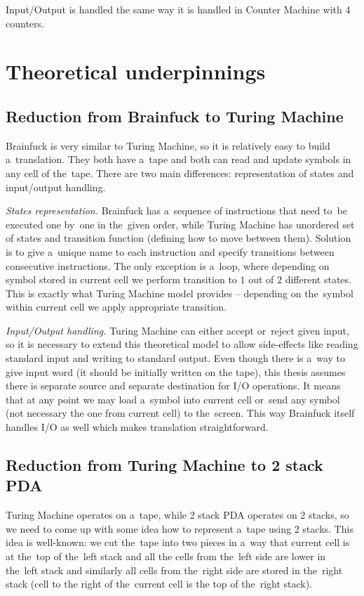 \documentclass[english,shortabstract,mgr]{iithesis}
\begin{document}
Input/Output is handled the same way it is handled in Counter Machine with 4 counters.


\chapter{Theoretical underpinnings}

\section {Reduction from Brainfuck to Turing Machine}

Brainfuck is very similar to Turing Machine, so it is relatively easy to build
a~translation. They both have a~tape and both can read and update symbols in any
cell of the~tape. There are two main differences: representation of states and
input/output handling.

\textit{States representation.}
Brainfuck has a~sequence of instructions that need to~be
executed one by~one in the~given order, while Turing Machine has unordered set
of states and transition function (defining how to move between them). Solution
is to give a~unique name to each instruction and specify transitions between
consecutive instructions. The only exception is a~loop, where depending on
symbol stored in current cell we perform transition to $1$ out of $2$ different states.
This is exactly what Turing Machine model provides -- depending on the~symbol
within current cell we apply appropriate transition.

\textit{Input/Output handling.}
Turing Machine can either accept or~reject given input, so it is necessary to
extend this theoretical model to allow side-effects like reading standard
input and writing to standard output. Even though there is a~way to give
input word (it should be initially written on the tape), this thesis assumes
there is separate source and separate destination for I/O operations.
It means that at any point we may load a~symbol into current cell or~send
any symbol (not necessary the one from current cell) to the~screen. This
way Brainfuck itself handles I/O as well which makes translation straightforward.

\section {Reduction from Turing Machine to 2 stack PDA}

Turing Machine operates on a~tape, while 2 stack PDA operates on 2 stacks, so we need
to come up with some idea how to represent a~tape using 2 stacks. This idea is well-known:
we cut the~tape into two pieces in a~way that current cell is at the~top of the~left stack and all
the cells from the~left side are lower in the~left stack and similarly all cells from the~right side
are stored in the~right stack (cell to the right of the~current cell is the top of the~right stack).
\end{document}
